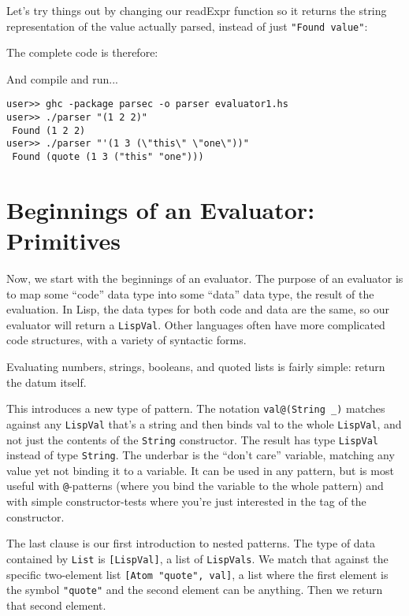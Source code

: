 Let's try things out by changing our readExpr function so it returns the string representation of the value actually parsed, instead of just \lstinline|"Found value"|:
 
 
The complete code is therefore:
 
 
And compile and run...
 
\begin{lstlisting}[language=shell,numbers=none,nolol]
user>> ghc -package parsec -o parser evaluator1.hs
user>> ./parser "(1 2 2)"
 Found (1 2 2)
user>> ./parser "'(1 3 (\"this\" \"one\"))"
 Found (quote (1 3 ("this" "one")))
\end{lstlisting}
 
\section{Beginnings of an Evaluator: Primitives}
 
Now, we start with the beginnings of an evaluator. The purpose of an evaluator is to map some ``code'' data type into some ``data'' data type, the result of the evaluation. In Lisp, the data types for both code and data are the same, so our evaluator will return a \verb|LispVal|. Other languages often have more complicated code structures, with a variety of syntactic forms.
 
Evaluating numbers, strings, booleans, and quoted lists is fairly simple: return the datum itself.
 
 
This introduces a new type of pattern. The notation \lstinline|val@(String _)| matches against any \verb|LispVal| that's a string and then binds val to the whole \verb|LispVal|, and not just the contents of the \verb|String| constructor. The result has type \verb|LispVal| instead of type \verb|String|. The underbar is the ``don't care'' variable, matching any value yet not binding it to a variable. It can be used in any pattern, but is most useful with \lstinline|@|-patterns (where you bind the variable to the whole pattern) and with simple constructor-tests where you're just interested in the tag of the constructor.
 
The last clause is our first introduction to nested patterns. The type of data contained by \verb|List| is \verb|[LispVal]|, a list of \verb|LispVals|. We match that against the specific two-element list \lstinline|[Atom "quote", val]|, a list where the first element is the symbol \lstinline|"quote"| and the second element can be anything. Then we return that second element.
 
